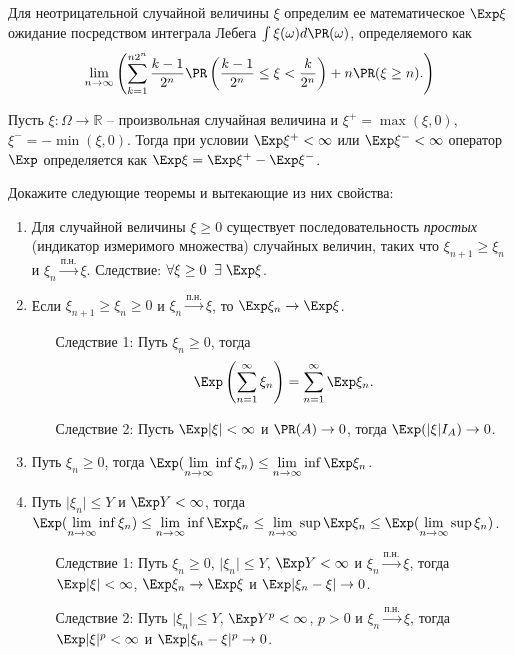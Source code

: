 \begin{problem}
Для неотрицательной случайной величины $\xi$ определим ее математическое $\Exp \xi$ ожидание посредством интеграла Лебега $\int \xi(\omega) d\PR(\omega)$, определяемого как 
\[
\lim \limits_{n \to \infty} \left(
  \sum \limits_{k = 1}^{n 2^n} \frac{k-1}{2^n} \PR\left(  \frac{k-1}{2^n} \leq \xi <  \frac{k}{2^n}  \right) + n \PR(\xi \geq n). 
\right)
\] 

Пусть $\xi: \Omega \to \mathbb{R}$ -- произвольная случайная величина и $\xi^{+} = \max (\xi, 0)$, $\xi^{-} = - \min (\xi, 0)$. Тогда при условии $\Exp \xi^{+} < \infty$ или $\Exp \xi^{-} < \infty$ оператор $\Exp$ определяется как 
$\Exp \xi = \Exp \xi^{+} - \Exp \xi^{-}$. 

Докажите следующие теоремы и вытекающие из них свойства:

\begin{enumerate}
\item Для случайной величины $\xi \geq 0$ существует последовательность \textit{простых} (индикатор измеримого множества) случайных величин, таких что $\xi_{n+1} \geq \xi_n$ и $\xi_n \mathop{\longrightarrow} \limits^{\text{п.н.}} \xi$. Следствие: $\forall \xi \geq 0 \;\; \exists \; \Exp \xi$.
\item Если  $\xi_{n+1} \geq \xi_n \geq 0$ и $\xi_n \mathop{\longrightarrow} \limits^{\text{п.н.}} \xi$, то $\Exp \xi_n \to \Exp \xi$. 
\begin{enumerate}
\item[Следствие 1:] Путь $\xi_n \geq 0$, тогда 
\[ \Exp\left(\sum \limits_{n=1}^{\infty} \xi_n \right) = \sum \limits_{n=1}^{\infty} \Exp \xi_n. \]
\item[Следствие 2:] Пусть $\Exp \vert \xi \vert < \infty$ и $\PR(A) \to 0$, тогда $\Exp (\vert \xi \vert I_A) \to 0$. 
\end{enumerate}
\item Путь $\xi_n \geq 0$, тогда $\Exp (\lim \limits_{n\to\infty} \inf \xi_n) \leq \lim \limits_{n\to\infty} \inf \Exp \xi_n$. 
\item Путь $\vert \xi_n \vert \leq Y$ и $\Exp Y < \infty$, тогда $\Exp (\lim \limits_{n\to\infty} \inf \xi_n) \leq \lim \limits_{n\to\infty} \inf \Exp \xi_n  \leq \lim \limits_{n\to\infty} \sup \Exp \xi_n  \leq \Exp (\lim \limits_{n\to\infty} \sup \xi_n)$.
\begin{enumerate}
\item[Следствие 1:] Путь $\xi_n \geq 0$, $\vert \xi_n \vert \leq Y$, $\Exp Y < \infty$ и $\xi_n \mathop{\longrightarrow} \limits^{\text{п.н.}} \xi$, тогда $\Exp \vert \xi \vert < \infty$, $\Exp \xi_n \to \Exp \xi$ и $\Exp \vert \xi_n - \xi \vert \to 0$.
\item[Следствие 2:] Путь $\vert \xi_n \vert \leq Y$, $\Exp Y^p < \infty$, $p >0$ и $\xi_n \mathop{\longrightarrow} \limits^{\text{п.н.}} \xi$, тогда $\Exp \vert \xi \vert^p < \infty$ и $\Exp \vert \xi_n - \xi \vert^p \to 0$. 
\end{enumerate}
\end{enumerate} 

\end{problem}

